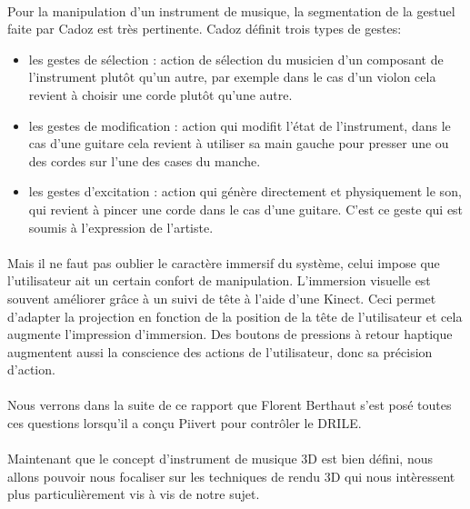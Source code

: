\paragraph{}
Pour la manipulation d'un instrument de musique, la segmentation de la gestuel faite par Cadoz \cite{cadoz1999musique} est très pertinente. Cadoz définit trois types de gestes:

\begin{itemize}
\item les gestes de sélection : action de sélection du musicien d'un composant de l'instrument plutôt qu'un autre, par exemple dans le cas d'un violon cela revient à choisir une corde plutôt qu'une autre.
\item les gestes de modification : action qui modifit l'état de l'instrument, dans le cas d'une guitare cela revient à utiliser sa main gauche pour presser une ou des cordes sur l'une des cases du manche.
\item les gestes d'excitation : action qui génère directement et physiquement le son, qui revient à pincer une corde dans le cas d'une guitare. C'est ce geste qui est soumis à l'expression de l'artiste.
\end{itemize}

\paragraph{}
Mais il ne faut pas oublier le caractère immersif du système, celui impose que l'utilisateur ait un certain confort de manipulation. L'immersion visuelle est souvent améliorer grâce à un suivi de tête à l'aide d'une Kinect. Ceci permet d'adapter la projection en fonction de la position de la tête de l'utilisateur et cela augmente l'impression d'immersion.
Des boutons de pressions à retour haptique augmentent aussi la conscience des actions de l'utilisateur, donc sa précision d'action.

\paragraph{}
Nous verrons dans la suite de ce rapport que Florent Berthaut s'est posé toutes ces questions lorsqu'il a conçu Piivert \cite{berthaut2010piivert} pour contrôler le DRILE.

\paragraph{}
Maintenant que le concept d'instrument de musique 3D est bien défini, nous allons pouvoir nous focaliser sur les techniques de rendu 3D qui nous intèressent plus particulièrement vis à vis de notre sujet.

